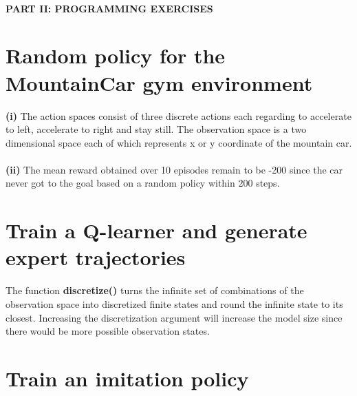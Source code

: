 \documentclass{article}
\begin{document}
\paragraph{PART II: PROGRAMMING EXERCISES}
\section{Random policy for the MountainCar gym environment}
\textbf{(i)} The action spaces consist of three discrete actions each regarding to accelerate to left, accelerate to right and stay still. The observation space is a two dimensional space each of which represents x or y coordinate of the mountain car.\\\\
\textbf{(ii)} The mean reward obtained over 10 episodes remain to be -200 since the car never got to the goal based on a random policy within 200 steps.

\section{Train a Q-learner and generate expert trajectories}
The function \textbf{discretize()} turns the infinite set of combinations of the observation space into discretized finite states and round the infinite state to its closest. Increasing the discretization argument  will increase the model size since there would be more possible observation states.
\section{Train an imitation policy}
\end{document}
